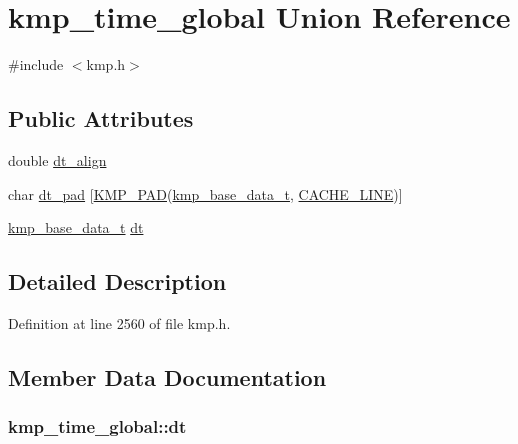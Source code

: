 \hypertarget{unionkmp__time__global}{\section{kmp\-\_\-time\-\_\-global Union Reference}
\label{unionkmp__time__global}
}


{\ttfamily \#include $<$kmp.\-h$>$}

\subsection*{Public Attributes}
\begin{DoxyCompactItemize}
\item 
double \hyperlink{unionkmp__time__global_a605cfd0b6711e1888aa3101c3924356b}{dt\-\_\-align}
\item 
char \hyperlink{unionkmp__time__global_a64f185eac5ca727cb2ca06d7a9146c65}{dt\-\_\-pad} \mbox{[}\hyperlink{kmp__lock_8h_a7e782410115489f45ab1686c39a2bb89}{K\-M\-P\-\_\-\-P\-A\-D}(\hyperlink{kmp_8h_a70eaeca396fffda9b8844afc81efa073}{kmp\-\_\-base\-\_\-data\-\_\-t}, \hyperlink{kmp__os_8h_a86194c659a2d795e5f5949d293ae4661}{C\-A\-C\-H\-E\-\_\-\-L\-I\-N\-E})\mbox{]}
\item 
\hyperlink{kmp_8h_a70eaeca396fffda9b8844afc81efa073}{kmp\-\_\-base\-\_\-data\-\_\-t} \hyperlink{unionkmp__time__global_aa9e86e5a1f06ec115a3a87210b720c31}{dt}
\end{DoxyCompactItemize}


\subsection{Detailed Description}


Definition at line 2560 of file kmp.\-h.



\subsection{Member Data Documentation}
\hypertarget{unionkmp__time__global_aa9e86e5a1f06ec115a3a87210b720c31}{
\subsubsection[{dt}]{ kmp\-\_\-time\-\_\-global\-::dt}}\label{unionkmp__time__global_aa9e86e5a1f06ec115a3a87210b720c31}


